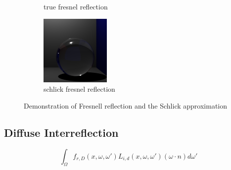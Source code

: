 \begin{figure}[h]
\begin{subfigure}[b]{0.3\textwidth}
	\caption{true fresnel reflection}
\end{subfigure}
\begin{subfigure}[b]{0.3\textwidth}
	\includegraphics[width=\textwidth]{./images/renders/refraction/render-schlick.png}
	\caption{schlick fresnel reflection}
\end{subfigure}
\caption{Demonstration of Fresnell reflection and the Schlick approximation}
\label{fig:shlick-compare}
\end{figure}

\subsection{Diffuse Interreflection}
\begin{equation}
		\int_{\Omega}
			f_{r,D}(x, \omega, \omega')
			L_{i,d}(x,\omega,\omega')
			(\omega \cdot n)d\omega'
\end{equation}

